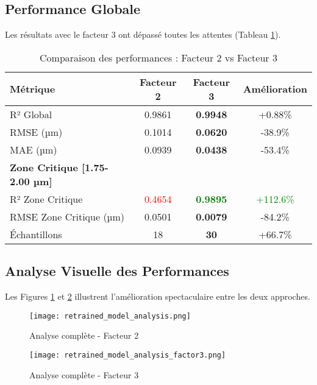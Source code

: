 \documentclass[11pt,a4paper,twocolumn]{article}
\begin{document}
\subsection{Performance Globale}

Les résultats avec le facteur 3 ont dépassé toutes les attentes (Tableau \ref{tab:comparison}).

\begin{table}[H]
\centering
\caption{Comparaison des performances : Facteur 2 vs Facteur 3}
\label{tab:comparison}
\begin{tabular}{@{}lccc@{}}
\toprule
\textbf{Métrique} & \textbf{Facteur 2} & \textbf{Facteur 3} & \textbf{Amélioration} \\
\midrule
R² Global & 0.9861 & \textbf{0.9948} & +0.88\% \\
RMSE (µm) & 0.1014 & \textbf{0.0620} & -38.9\% \\
MAE (µm) & 0.0939 & \textbf{0.0438} & -53.4\% \\
\midrule
\textbf{Zone Critique [1.75-2.00 µm]} & & & \\
R² Zone Critique & \textcolor{red}{0.4654} & \textcolor{green}{\textbf{0.9895}} & \textcolor{green}{+112.6\%} \\
RMSE Zone Critique (µm) & 0.0501 & \textbf{0.0079} & -84.2\% \\
Échantillons & 18 & \textbf{30} & +66.7\% \\
\bottomrule
\end{tabular}
\end{table}

\subsection{Analyse Visuelle des Performances}

Les Figures \ref{fig:factor2_analysis} et \ref{fig:factor3_analysis} illustrent l'amélioration spectaculaire entre les deux approches.

\begin{figure*}[t]
\centering
\begin{subfigure}{0.48\textwidth}
    \centering
    \texttt{[image: retrained\_model\_analysis.png]}
    \caption{Analyse complète - Facteur 2}
    \label{fig:factor2_analysis}
\end{subfigure}
\hfill
\begin{subfigure}{0.48\textwidth}
    \centering
    \texttt{[image: retrained\_model\_analysis\_factor3.png]}
    \caption{Analyse complète - Facteur 3}
    \label{fig:factor3_analysis}
\end{subfigure}
\caption{Comparaison des analyses de performance : (a) Facteur 2 avec zone critique problématique, (b) Facteur 3 avec maîtrise complète de la zone critique. Les graphiques montrent les courbes d'entraînement, scatter plots prédictions vs réalité, distribution des erreurs, et performance par plage de gap.}
\label{fig:performance_comparison}
\end{figure*}
\end{document}

